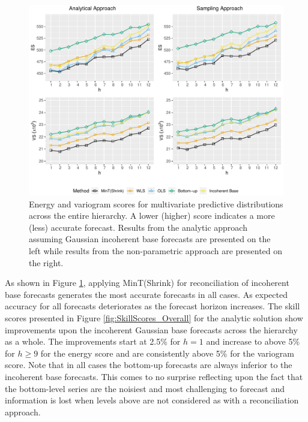 \documentclass[12pt]{article}
\theoremstyle{definition}
\begin{document}
\begin{figure}
	\centering
	\small
    \includegraphics[width=.95\textwidth]{Empirical-results/Results-ARIMA/RawScore_Overall.pdf}
	\caption{Energy and variogram scores for multivariate predictive distributions across the entire hierarchy. A lower (higher) score indicates a more (less) accurate forecast. Results from the analytic approach assuming Gaussian incoherent base forecasts are presented on the left while results from the non-parametric approach are presented on the right.} \label{fig:Scores_Overall}
\end{figure}

As shown in Figure \ref{fig:Scores_Overall}, applying MinT(Shrink) for reconciliation of incoherent base forecasts generates the most accurate forecasts in all cases. As expected accuracy for all forecasts deteriorates as the forecast horizon increases. The skill scores presented in Figure \ref{fig:SkillScores_Overall} for the analytic solution show improvements upon the incoherent Gaussian base forecasts across the hierarchy as a whole. The improvements start at 2.5\% for $h=1$ and increase to above 5\% for $h\ge 9$ for the energy score and are consistently above 5\% for the variogram score. Note that in all cases the bottom-up forecasts are always inferior to the incoherent base forecasts. This comes to no surprise reflecting upon the fact that the bottom-level series are the noisiest and most challenging to forecast and information is lost when levels above are not considered as with a reconciliation approach.
\end{document}
